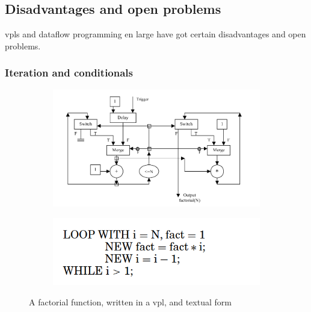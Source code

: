 \subsection{Disadvantages and open problems}
\label{sec:background:vpl:disadvantages}
 
\ac{vpl}s and dataflow programming en large have got certain disadvantages and open problems.




\subsubsection*{Iteration and conditionals}

\begin{figure}
  \centering
  \begin{subfigure}[b]{0.45\linewidth}
    \graphicspath{{../../assets/images/background/vpl/}}
    \centering
    \includegraphics[width=\linewidth]{iteration-vpl.png}
    \caption{}\label{fig:vpl-iteration:1}
  \end{subfigure}%
  \qquad %
  \begin{subfigure}[b]{0.45\linewidth}
    \graphicspath{{../../assets/images/background/vpl/}}
    \centering
    \includegraphics[width=\linewidth]{iteration-text.png}
    \caption{}\label{fig:vpl-iteration:2}
  \end{subfigure}%
  \caption[Comparrison of iteration]{A factorial function, written in a vpl, and textual form}%
  \label{fig:vpl-iteration}
\end{figure}

